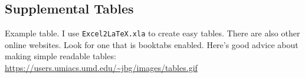 \subsection*{Supplemental Tables}
\setcounter{table}{0} %
\renewcommand{\thetable}{S\arabic{table}} %


    {Example table.} %
    {I use \texttt{Excel2LaTeX.xla} to create easy tables. There are also other online websites. Look for one that is booktabs enabled. Here's good advice about making simple readable tables: \url{https://users.umiacs.umd.edu/~jbg/images/tables.gif}} %
\sampleTable



\clearpage

